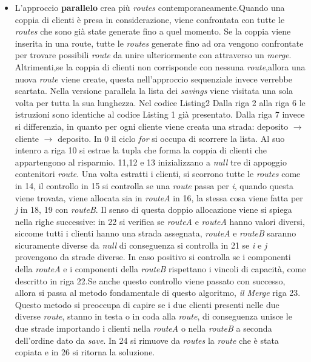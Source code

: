 \documentclass[]{article}
\begin{document}
\begin{itemize}
\item  L'approccio \textbf{parallelo} crea più \emph{routes} contemporaneamente.Quando una coppia di clienti è presa in considerazione, viene confrontata con tutte le \emph{routes} che sono già state generate fino a quel momento.
Se la coppia viene inserita in una route, tutte le \emph{routes} generate fino ad ora vengono confrontate per trovare possibili \emph{route} da unire ulteriormente con attraverso un \emph{merge}. Altrimenti,se la coppia di clienti non corrisponde con nessuna \emph{route},allora una nuova \emph{route} viene create, questa nell'approccio sequenziale invece verrebbe scartata. Nella versione parallela la lista dei \emph{savings} viene visitata una sola volta per tutta la sua lunghezza.
Nel codice Listing2 Dalla riga 2 alla riga 6 le istruzioni sono identiche al codice Listing 1 già presentato. Dalla riga 7 invece si differenzia, in quanto per ogni cliente viene creata una strada: deposito $\rightarrow$ cliente $\rightarrow$ deposito. In 0 il ciclo \emph{for} si occupa di scorrere la lista. Al suo intenro a riga 10 si estrae la tupla che forma la coppia di clienti che appartengono al risparmio. 11,12 e 13 inizializzano a \emph{null} tre di appoggio contenitori \emph{route}. Una volta estratti i clienti, si scorrono tutte le \emph{routes} come in 14, il controllo in 15 si controlla se una \emph{route} passa per \emph{i}, quando questa viene trovata, viene allocata sia in \emph{routeA} in 16, la stessa cosa viene fatta per \emph{j} in 18, 19 con  \emph{routeB}. Il senso di questa doppio allocazione viene si spiega nella righe successive: in 22 si verifica se  \emph{routeA} e \emph{routeA} hanno valori diversi, siccome tutti i clienti hanno una strada assegnata, \emph{routeA} e \emph{routeB} saranno sicuramente diverse da \emph{null} di conseguenza si controlla in 21 se \emph{i} e \emph{j} provengono da strade diverse. In caso positivo si controlla se i componenti della \emph{routeA} e i componenti della \emph{routeB}  rispettano i vincoli di capacità, come descritto in riga 22.Se anche questo controllo viene passato con successo, allora si passa al metodo fondamentale di questo algoritmo, \emph{il Merge}	riga 23.
Questo metodo si preoccupa di capire se i due clienti presenti nelle due diverse \emph{route}, stanno in testa o in coda alla \emph{route}, di conseguenza unisce le due strade importando i clienti nella \emph{routeA} o nella \emph{routeB} a seconda dell'ordine dato da \emph{save}. In 24 si rimuove da \emph{routes} la \emph{route} che è stata copiata e in 26 si ritorna la soluzione.
\end{itemize}
\end{document}
